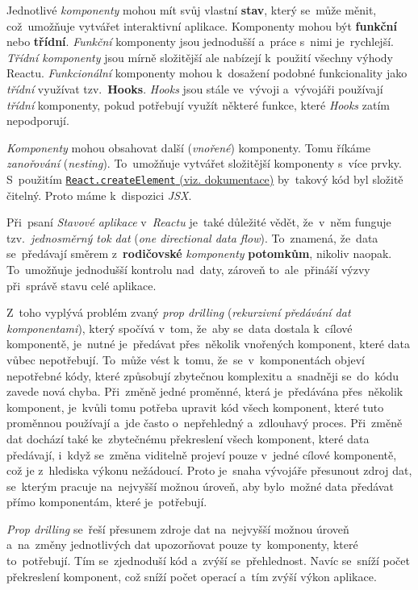 \documentclass[11pt,a4paper]{report}
\begin{document}
            Jednotlivé \emph{komponenty} mohou mít svůj vlastní \textbf{stav}, který se~může měnit, což~umožňuje vytvářet interaktivní aplikace. Komponenty mohou být \textbf{funkční} nebo \textbf{třídní}. \emph{Funkční} komponenty jsou jednodušší a~práce s~nimi je~rychlejší. \emph{Třídní komponenty} jsou mírně složitější ale nabízejí k~použití všechny výhody Reactu. \emph{Funkcionální} komponenty mohou k~dosažení podobné funkcionality jako \emph{třídní} využívat tzv.~\textbf{Hooks}. \emph{Hooks} jsou stále ve~vývoji a~vývojáři používají \emph{třídní} komponenty, pokud potřebují využít některé funkce, které \emph{Hooks} zatím nepodporují.

            \emph{Komponenty} mohou obsahovat další (\emph{vnořené}) komponenty. Tomu říkáme \emph{zanořování} (\emph{nesting}). To~umožňuje vytvářet složitější komponenty s~více prvky. S~použitím \href{https://react.dev/reference/react/createElement}{\texttt{React.createElement} (viz. dokumentace)} by~takový kód byl složitě čitelný. Proto máme k~dispozici \emph{JSX}.

            Při~psaní \emph{Stavové aplikace} v~\emph{Reactu} je~také důležité vědět, že~v~něm funguje tzv.~\emph{jednosměrný tok dat} (\emph{one directional data flow}). To~znamená, že~data se~předávají směrem z~\textbf{rodičovské} \emph{komponenty} \textbf{potomkům}, nikoliv naopak. To~umožňuje jednodušší kontrolu nad~daty, zároveň to~ale~přináší výzvy při~správě stavu celé aplikace.
            
            Z~toho vyplývá problém zvaný \emph{prop drilling} (\emph{rekurzivní předávání dat komponentami}), který spočívá v~tom, že~aby se~data dostala k~cílové komponentě, je~nutné je~předávat přes~několik vnořených komponent, které data vůbec nepotřebují. To~může vést k~tomu, že~se~v~komponentách objeví nepotřebné kódy, které způsobují zbytečnou komplexitu a~snadněji se~do~kódu zavede nová chyba. Při~změně jedné proměnné, která je~předávána přes~několik komponent, je~kvůli tomu potřeba upravit kód všech komponent, které tuto proměnnou používají a~jde často o~nepřehledný a~zdlouhavý proces. Při~změně dat dochází také ke~zbytečnému překreslení všech komponent, které data předávají, i~když se~změna viditelně projeví pouze v~jedné cílové komponentě, což je z~hlediska výkonu nežádoucí. Proto je~snaha vývojáře přesunout zdroj dat, se~kterým pracuje na~nejvyšší možnou úroveň, aby bylo~možné data předávat přímo komponentám, které je~potřebují.

            \emph{Prop drilling} se~řeší přesunem zdroje dat na~nejvyšší možnou úroveň a~na~změny jednotlivých dat upozorňovat pouze ty~komponenty, které to~potřebují. Tím se~zjednoduší kód a~zvýší se~přehlednost. Navíc se~sníží počet překreslení komponent, což sníží počet operací a~tím zvýší výkon aplikace.
            
\end{document}
